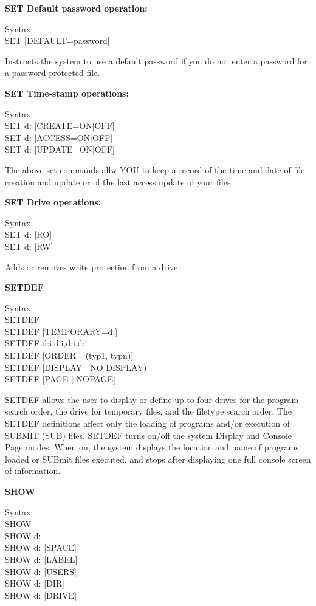 \textbf{SET Default password operation:}

\hangindent=0.7cm Syntax:\\
SET [DEFAULT=password]

Instructs the system to use a default password if you do not enter a
password for a password-protected file.

\textbf{SET Time-stamp operations:}

\hangindent=0.7cm Syntax:\\
SET {d:} [CREATE=ON\(|\)OFF]\\
SET {d:} [ACCESS=ON\(|\)OFF]\\
SET {d:} [UPDATE=ON\(|\)OFF]

The above set commands allw YOU to keep a record of the time and date
of file creation and update or of the last access update of your
files.

\textbf{SET Drive operations:}

\hangindent=0.7cm Syntax:\\
SET {d:} [RO]\\
SET {d:} [RW]

Adds or removes write protection from a drive.

\textbf{SETDEF}

\hangindent=0.7cm Syntax:\\
SETDEF\\
SETDEF [TEMPORARY=d:]\\
SETDEF d:i,d:i,d:i,d:i\\
SETDEF [ORDER= (typ1, typn)]\\
SETDEF [DISPLAY \(|\) NO DISPLAY)\\
SETDEF [PAGE \(|\) NOPAGE]

SETDEF allows the user to display or define up to four drives for the
program search order, the drive for temporary files, and the filetype
search order. The SETDEF definitions affect only the loading of
programs and/or execution of SUBMIT (SUB) files. SETDEF turns on/off
the system Display and Console Page modes. When on, the system
displays the location and name of programs loaded or SUBmit files
executed, and stops after displaying one full console screen of
information.

\textbf{SHOW}

\hangindent=0.7cm Syntax:\\
SHOW\\
SHOW d:\\
SHOW d: [SPACE]\\
SHOW d: [LABEL]\\
SHOW d: [USERS]\\
SHOW d: [DIR]\\
SHOW d: [DRIVE]

